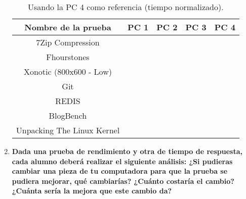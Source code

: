 \documentclass[12pt]{article}
\newcommand{\pl}[1]{\item \textbf{ #1 }}
\begin{document}
\begin{enumerate}[(3.4.1)]
    \begin{table}[htb]
        \centering
        \begin{tabular}{|c|c|c|c|c|}
        \hline
        \textbf{Nombre de la prueba} & \textbf{PC 1} & \textbf{PC 2} & \textbf{PC 3} & \textbf{PC 4}\\
        \hline
        7Zip Compression & & & & \\
        \hline
        Fhourstones & & & & \\
        \hline
        Xonotic (800x600 - Low) & & & &  \\
        \hline
        Git & & & &  \\
        \hline
        REDIS & & & &  \\
        \hline
        BlogBench & & & &  \\
        \hline
        Unpacking The Linux Kernel & & & & \\
        \hline
        \end{tabular}
        \caption{Usando la PC 4 como referencia (tiempo normalizado).}
    \end{table}

    \pl{Dada una prueba de rendimiento y otra de tiempo de respuesta, cada alumno deberá realizar el siguiente análisis: ¿Si pudieras cambiar una pieza de tu computadora para que la prueba se pudiera mejorar, qué cambiarías? ¿Cuánto costaría el cambio? ¿Cuánta sería la mejora que este cambio da?}

\end{enumerate}

\newpage
\end{document}
